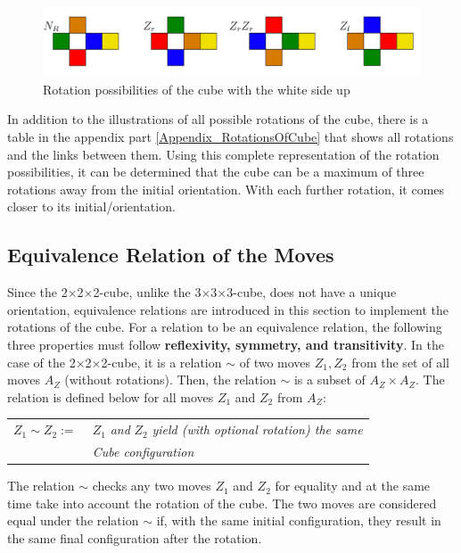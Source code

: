 \documentclass[12pt,a4paper]{article}
\theoremstyle{custom}
\newcommand{\Ttwo}{2$\times$2$\times$2-}
\newcommand{\Tthree}{3$\times$3$\times$3-}
\begin{document}
\begin{figure}[H]
\centering
\includegraphics[scale=0.063]{RotationWhite.png}
\caption{Rotation possibilities of the cube with the white side up}
\label{ImageCubeRotationWhiteSide}
\end{figure}
In addition to the illustrations of all possible rotations of the cube, there is a table in the appendix part \ref{Appendix_RotationsOfCube} that shows all rotations and the links between them. Using this complete representation of the rotation possibilities, it can be determined that the cube can be a maximum of three rotations away from the initial orientation. With each further rotation, it comes closer to its initial/orientation.
\subsection{Equivalence Relation of the Moves}
\label{Section_EquivalenceRelationOfMoves}

Since the \Ttwo cube, unlike the \Tthree cube, does not have a unique orientation, equivalence relations are introduced in this section to implement the rotations of the cube.
For a relation to be an equivalence relation, the following three properties must follow \textbf{reflexivity, symmetry, and transitivity}. 
In the case of the \Ttwo cube, it is a relation $\sim$ of two moves $Z_1, Z_2$ from the set of all moves $A_Z$ (without rotations). Then, the relation $\sim$ is a subset of $A_Z \times A_Z$.
The relation is defined below for all moves $Z_1$ and $Z_2$ from $A_Z$:

\begin{center}
\begin{tabular}{l l}
$Z_1 \sim Z_2 := \ $ & $Z_1$ \textit{and} $Z_2$ \textit{yield (with optional rotation) the same }\\
\ & \textit{Cube configuration} \\
\end{tabular}
\end{center}

The relation $\sim$ checks any two moves $Z_1$ and $Z_2$ for equality and at the same time take into account the rotation of the cube. The two moves are considered equal under the relation $\sim$ if, with the same initial configuration, they result in the same final configuration after the rotation.
\end{document}
